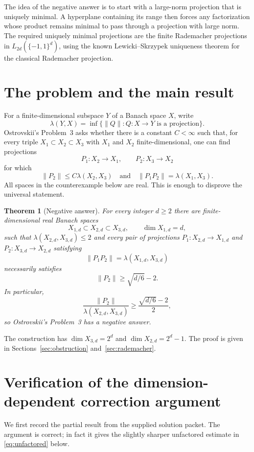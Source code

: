\documentclass[11pt]{article}
\newtheorem{theorem}{Theorem}[section]
\theoremstyle{remark}
\begin{document}
The idea of the negative answer is to start with a large-norm projection that
is uniquely minimal.  A hyperplane containing its range then forces any
factorization whose product remains minimal to pass through a projection with
large norm.  The required uniquely minimal projections are the finite
Rademacher projections in $L_{2d}(\{-1,1\}^d)$, using the known
Lewicki--Skrzypek uniqueness theorem for the classical Rademacher projection.

\section{The problem and the main result}

For a finite-dimensional subspace $Y$ of a Banach space $X$, write
\[
 \lambda(Y,X)=\inf\{\|Q\|: Q:X\to Y\text{ is a projection}\}.
\]
Ostrovskii's Problem~3 \cite{Ostrovskii} asks whether there is a constant $C<\infty$ such that,
for every triple $X_1\subset X_2\subset X_3$ with $X_1$ and $X_2$
finite-dimensional, one can find projections
\[
 P_1:X_2\to X_1,\qquad P_2:X_3\to X_2
\]
for which
\[
 \|P_2\|\leq C\lambda(X_2,X_3)
 \quad\text{and}\quad
 \|P_1P_2\|=\lambda(X_1,X_3).
\]
All spaces in the counterexample below are real.  This is enough to disprove
the universal statement.

\begin{theorem}[Negative answer]\label{thm:main}
For every integer $d\geq 2$ there are finite-dimensional real Banach spaces
\[
 X_{1,d}\subset X_{2,d}\subset X_{3,d},
 \qquad \dim X_{1,d}=d,
\]
such that $\lambda(X_{2,d},X_{3,d})\leq 2$ and every pair of projections
$P_1:X_{2,d}\to X_{1,d}$ and $P_2:X_{3,d}\to X_{2,d}$ satisfying
\[
       \|P_1P_2\|=\lambda(X_{1,d},X_{3,d})
\]
necessarily satisfies
\[
       \|P_2\|\geq \sqrt{d/6}-2.
\]
In particular,
\[
 \frac{\|P_2\|}{\lambda(X_{2,d},X_{3,d})}
 \geq \frac{\sqrt{d/6}-2}{2},
\]
so Ostrovskii's Problem~3 has a negative answer.
\end{theorem}

The construction has $\dim X_{3,d}=2^d$ and
$\dim X_{2,d}=2^d-1$.  The proof is given in Sections~\ref{sec:obstruction}
and~\ref{sec:rademacher}.

\section{Verification of the dimension-dependent correction argument}
\label{sec:correction}

We first record the partial result from the supplied solution packet.  The
argument is correct; in fact it gives the slightly sharper unfactored estimate
in \eqref{eq:unfactored} below.
\end{document}
